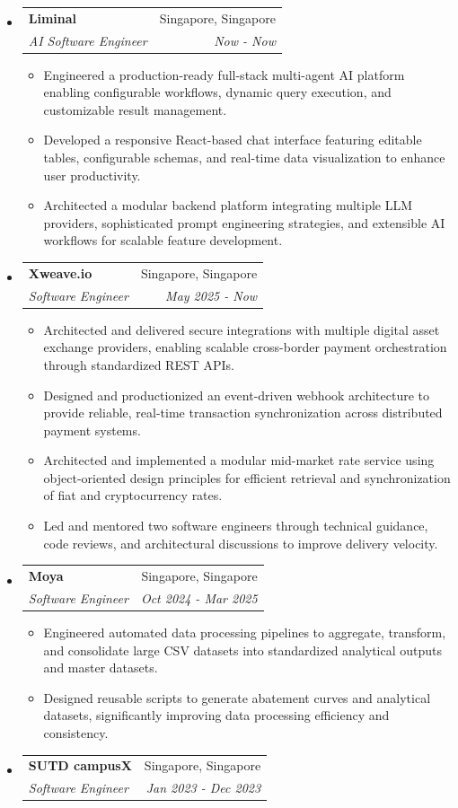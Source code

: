 \documentclass[letterpaper,11pt]{article}
\makeatletter
\newcommand{\resitem}[1]{\item #1 \vspace{-2pt}}
\newcommand{\ressubheading}[4]{
    \begin{tabular*}{6.5in}{p{4.8in}@{\extracolsep{\fill}}r}
            \textbf{#1} & #2 \\
            \textit{#3} & \textit{#4} \\
    \end{tabular*}\vspace{-8pt}}
\makeatother
\begin{document}
      \begin{itemize}
        \item \ressubheading{Liminal}{Singapore, Singapore}{AI Software Engineer}{Now - Now}
        \begin{itemize}
            \resitem{Engineered a production-ready full-stack multi-agent AI platform enabling configurable workflows, dynamic query execution, and customizable result management.}
            \resitem{Developed a responsive React-based chat interface featuring editable tables, configurable schemas, and real-time data visualization to enhance user productivity.}
            \resitem{Architected a modular backend platform integrating multiple LLM providers, sophisticated prompt engineering strategies, and extensible AI workflows for scalable feature development.}
        \end{itemize}
        \item \ressubheading{Xweave.io}{Singapore, Singapore}{Software Engineer}{May 2025 - Now}
        \begin{itemize}
            \resitem{Architected and delivered secure integrations with multiple digital asset exchange providers, enabling scalable cross-border payment orchestration through standardized REST APIs.}
            \resitem{Designed and productionized an event-driven webhook architecture to provide reliable, real-time transaction synchronization across distributed payment systems.}
            \resitem{Architected and implemented a modular mid-market rate service using object-oriented design principles for efficient retrieval and synchronization of fiat and cryptocurrency rates.}
            \resitem{Led and mentored two software engineers through technical guidance, code reviews, and architectural discussions to improve delivery velocity.}
        \end{itemize}
        \item \ressubheading{Moya}{Singapore, Singapore}{Software Engineer}{Oct 2024 - Mar 2025}
        \begin{itemize}
            \resitem{Engineered automated data processing pipelines to aggregate, transform, and consolidate large CSV datasets into standardized analytical outputs and master datasets.}
            \resitem{Designed reusable scripts to generate abatement curves and analytical datasets, significantly improving data processing efficiency and consistency.}
        \end{itemize}
        \item \ressubheading{SUTD campusX}{Singapore, Singapore}{Software Engineer}{Jan 2023 - Dec 2023}

\end{itemize}
\end{document}
